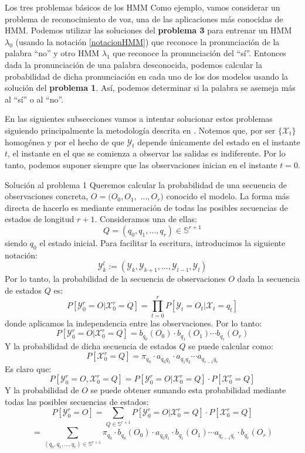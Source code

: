 \begin{section}{Los tres problemas básicos de los HMM}
Como ejemplo, vamos considerar un problema de reconocimiento de voz, una de las aplicaciones más conocidas de HMM. Podemos utilizar las soluciones del \textbf{problema 3} para entrenar un HMM $\lambda_0$ (usando la notación \eqref{notacionHMM}) que reconoce la pronunciación de la palabra \enquote{no} y otro HMM $\lambda_1$ que reconoce la pronunciación del \enquote{sí}. Entonces dada la pronunciación de una palabra desconocida, podemos calcular la probabilidad de dicha pronunciación en cada uno de los dos modelos usando la solución del \textbf{problema 1}. Así, podemos determinar si la palabra se asemeja más al \enquote{sí} o al \enquote{no}.  

En las siguientes subsecciones vamos a intentar solucionar estos problemas siguiendo principalmente la metodología descrita en \cite{Rabiner}. Notemos que, por ser $\{\mathcal{X}_t\}$ homogénea y por el hecho de que $\mathcal{Y}_t$ depende únicamente del estado en el instante $t$, el instante en el que se comienza a observar las salidas es indiferente. Por lo tanto, podemos suponer siempre que las observaciones inician en el instante $t=0$.

\begin{subsection}{Solución al problema 1}
Queremos calcular la probabilidad de una secuencia de observaciones concreta, $O=(O_0,O_1,$ $\dots, O_r)$ conocido el modelo. La forma más directa de hacerlo es mediante enumeración de todas las posibles secuencias de estados de longitud $r+1$. Consideramos una de ellas:
\[Q=(q_0 , q_1 , \dots , q_r)\in\mathbb{S}^{r+1}\]
siendo $q_0$ el estado inicial. Para facilitar la escritura, introducimos la siguiente notación:
\[\mathcal{Y}_k^l:=(\mathcal{Y}_{k},\mathcal{Y}_{k+1},\dots,\mathcal{Y}_{l-1},\mathcal{Y}_{l})\]
Por lo tanto, la probabilidad de la secuencia de observaciones $O$ dada la secuencia de estados $Q$ es:
\[P[\mathcal{Y}_0^r=O|\mathcal{X}_0^r=Q]=\prod_{t=0}^r P[\mathcal{Y}_{t}=O_t|\mathcal{X}_{t}=q_t]\]
donde aplicamos la independencia entre las observaciones. Por lo tanto:
\[P[\mathcal{Y}_0^r=O|\mathcal{X}_0^r=Q]=b_{q_0}(O_0)\cdot b_{q_1}(O_1)\cdots b_{q_r}(O_r)\]
Y la probabilidad de dicha secuencia de estados $Q$ se puede calcular como:
\[P[\mathcal{X}_0^r=Q]=\pi_{q_0}\cdot a_{q_0q_1}\cdot a_{q_1q_2}\cdots a_{q_{r-1}q_r} \]
Es claro que:
\[P[\mathcal{Y}_0^r=O,\mathcal{X}_0^r=Q]=P[\mathcal{Y}_0^r=O|\mathcal{X}_0^r=Q]\cdot P[\mathcal{X}_0^r=Q] \]
Y la probabilidad de $O$ se puede obtener sumando esta probabilidad mediante todas las posibles secuencias de estados:
\[P[\mathcal{Y}_0^r=O]=\sum_{Q\in\mathbb{S}^{r+1}}P[\mathcal{Y}_0^r=O|\mathcal{X}_0^r=Q]\cdot P[\mathcal{X}_0^r=Q]\]
\[=\sum_{(q_0 , q_1 , \dots , q_r)\in\mathbb{S}^{r+1}}\pi_{q_0}\cdot b_{q_0}(O_0)\cdot a_{q_0q_1}\cdot b_{q_1}(O_1)\cdots a_{q_{r-1}q_r}\cdot b_{q_r}(O_r)\]


\end{subsection}
\end{section}
